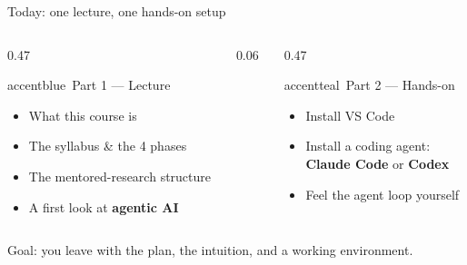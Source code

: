 \begin{frame}{Today: one lecture, one hands-on setup}
  \begin{columns}[t, totalwidth=\textwidth]
    \begin{column}{0.47\textwidth}
      \begin{featbox}{accentblue}{\faChalkboardTeacher\ Part 1 — Lecture}
        \small
        \begin{itemize}
          \item What this course is
          \item The syllabus \& the 4 phases
          \item The mentored-research structure
          \item A first look at \textbf{agentic AI}
        \end{itemize}
      \end{featbox}
    \end{column}
    \begin{column}{0.06\textwidth}\end{column}
    \begin{column}{0.47\textwidth}
      \begin{featbox}{accentteal}{\faLaptopCode\ Part 2 — Hands-on}
        \small
        \begin{itemize}
          \item Install VS Code
          \item Install a coding agent:\\ \textbf{Claude Code} or \textbf{Codex}
          \item Feel the agent loop yourself
        \end{itemize}
      \end{featbox}
    \end{column}
  \end{columns}
  \vspace{10pt}
  \begin{center}
    \small\color{midgray}Goal: you leave with the plan, the intuition, and a working environment.
  \end{center}
\end{frame}

